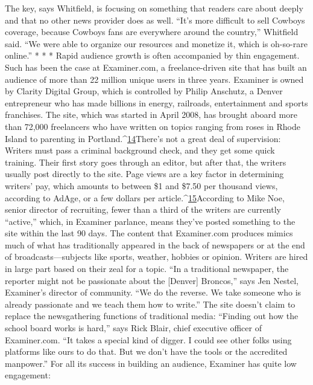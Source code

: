 The key, says Whitfield, is focusing on something that readers care about
deeply and that no other news provider does as well. ``It's more difficult to sell
Cowboys coverage, because Cowboys fans are everywhere around the country,''
Whitfield said. ``We were able to organize our resources and monetize it, which
is oh-so-rare online.''
* * *
Rapid audience growth is often accompanied by thin engagement. Such has
been the case at Examiner.com, a freelance-driven site that has built an audience
of more than 22 million unique users in three years.
Examiner is owned by Clarity Digital Group, which is controlled by Philip
Anschutz, a Denver entrepreneur who has made billions in energy, railroads,
entertainment and sports franchises. The site, which was started in April 2008,
has brought aboard more than 72,000 freelancers who have written on topics
ranging from roses in Rhode Island to parenting in Portland.^{\href{#endnotes-chapter-2}{14}}There's not a
great deal of supervision: Writers must pass a criminal background check, and
they get some quick training. Their first story goes through an editor, but after
that, the writers usually post directly to the site.
Page views are a key factor in determining writers' pay, which amounts to
between \$1 and \$7.50 per thousand views, according to AdAge, or a few dollars
per article.^{\href{#endnotes-chapter-2}{15}}According to Mike Noe, senior director of recruiting, fewer than a
third of the writers are currently ``active,'' which, in Examiner parlance, means
they've posted something to the site within the last 90 days.
The content that Examiner.com produces mimics much of what has traditionally
appeared in the back of newspapers or at the end of broadcasts—subjects
like sports, weather, hobbies or opinion. Writers are hired in large part
based on their zeal for a topic. ``In a traditional newspaper, the reporter might
not be passionate about the [Denver] Broncos,'' says Jen Nestel, Examiner's director
of community. ``We do the reverse. We take someone who is already
passionate and we teach them how to write.'' The site doesn't claim to replace
the newsgathering functions of traditional media: ``Finding out how the school
board works is hard,'' says Rick Blair, chief executive officer of Examiner.com.
``It takes a special kind of digger. I could see other folks using platforms like ours
to do that. But we don't have the tools or the accredited manpower.''
For all its success in building an audience, Examiner has quite low engagement:
